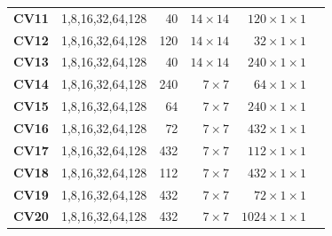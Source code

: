 \begin{table}[]
\begin{threeparttable}
\begin{tabular}{lrrrrr}
\textbf{CV11} & 1,8,16,32,64,128  & 40    & $14\times 14$   & $120 \times 1\times 1$\\
\textbf{CV12} & 1,8,16,32,64,128  & 120   & $14\times 14$   & $32 \times 1\times 1$\\
\textbf{CV13} & 1,8,16,32,64,128  & 40    & $14\times 14$   & $240 \times 1\times 1$\\
\textbf{CV14} & 1,8,16,32,64,128  & 240   & $7\times 7$     & $64  \times 1\times 1$\\
\textbf{CV15} & 1,8,16,32,64,128  & 64    & $7\times 7$     & $240 \times 1\times 1$\\
\textbf{CV16} & 1,8,16,32,64,128  & 72    & $7\times 7$     & $432 \times 1\times 1$\\
\textbf{CV17} & 1,8,16,32,64,128  & 432   & $7\times 7$     & $112 \times 1\times 1$\\
\textbf{CV18} & 1,8,16,32,64,128  & 112   & $7\times 7$     & $432 \times 1\times 1$\\
\textbf{CV19} & 1,8,16,32,64,128  & 432   & $7\times 7$     & $72 \times 1\times 1$\\
\textbf{CV20} & 1,8,16,32,64,128  & 432   & $7\times 7$     & $1024 \times 1\times 1$\\

\bottomrule
\end{tabular}
\end{threeparttable}
\end{table}

